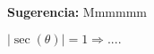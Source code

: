 \begin{Solution}{2.1}
     {\bf Sugerencia:} Mmmmmm
   
\end{Solution}
\begin{Solution}{2.2}
    $|\sec(\theta)|=1 \Longrightarrow....$
   
\end{Solution}

